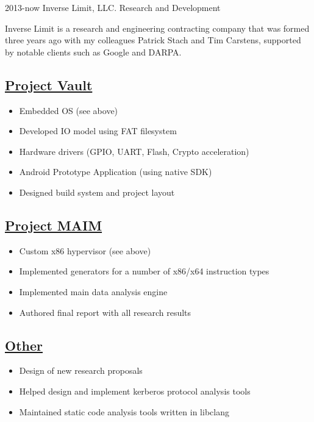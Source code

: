 \documentclass[]{friggeri-cv}
\newcommand{\heading}[1]{
  \vskip 0.05in
  \subsection{\uline{\small{#1}}}
  \vskip 0.05in
}
\begin{document}
\begin{entrylist}
  \entry
    {2013-now}
    {Inverse Limit, LLC.}
    {Research and Development}
    {

      Inverse Limit is a research and engineering contracting company
      that was formed three years ago with my colleagues
      Patrick Stach and Tim Carstens, supported by notable clients
      such as Google and DARPA. 

      \heading{Project Vault}
      
      \begin{itemize}
      \item{Embedded OS (see above)}
      \item{Developed IO model using FAT filesystem}
      \item{Hardware drivers (GPIO, UART, Flash, Crypto acceleration)}
      \item{Android Prototype Application (using native SDK)}
      \item{Designed build system and project layout}
      \end{itemize}

      \heading{Project MAIM}
      
      \begin{itemize}
      \item{Custom x86 hypervisor (see above)}
      \item{Implemented generators for a number of x86/x64 instruction types}
      \item{Implemented main data analysis engine}
      \item{Authored final report with all research results}
      \end{itemize}

      \heading{Other}
      
      \begin{itemize}
      \item{Design of new research proposals}
      \item{Helped design and implement kerberos protocol analysis tools}
      \item{Maintained static code analysis tools written in libclang}
      \end{itemize}
      
}
\end{entrylist}
\end{document}
